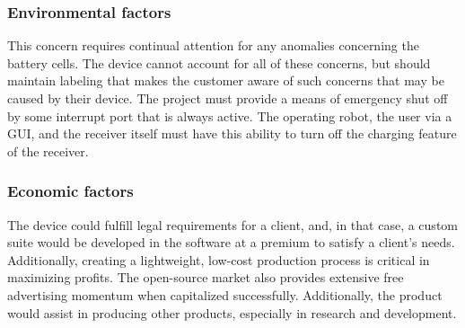 \documentclass[12pt]{article}
\begin{document}
\subsubsection{Environmental factors}
This concern requires continual attention for any anomalies concerning the battery cells.  The device cannot account for all of these concerns, but should maintain labeling that makes the customer aware of such concerns that may be caused by their device.  The project must provide a means of emergency shut off by some interrupt port that is always active.  The operating robot, the user via a GUI, and the receiver itself must have this ability to turn off the charging feature of the receiver.

\subsubsection{Economic factors}
The device could fulfill legal requirements for a client, and, in that case, a custom suite would be developed in the software at a premium to satisfy a client's needs.  Additionally, creating a lightweight, low-cost production process is critical in maximizing profits.  The open-source market also provides extensive free advertising momentum when capitalized successfully.  Additionally, the product would assist in producing other products, especially in research and development. \\

\hfill
\end{document}
